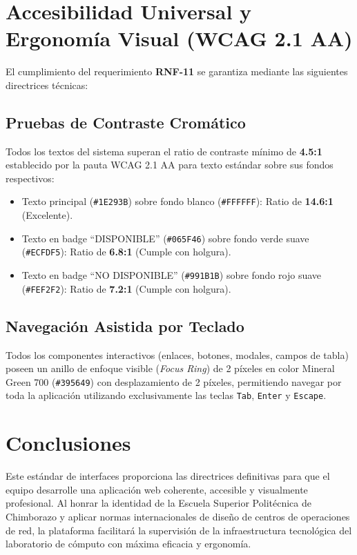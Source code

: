 \documentclass[12pt,a4paper]{report}
\begin{document}
\newpage
\chapter{Accesibilidad Universal y Ergonomía Visual (WCAG 2.1 AA)}

El cumplimiento del requerimiento \textbf{RNF-11} se garantiza mediante las siguientes directrices técnicas:

\section{Pruebas de Contraste Cromático}
Todos los textos del sistema superan el ratio de contraste mínimo de \textbf{4.5:1} establecido por la pauta WCAG 2.1 AA para texto estándar sobre sus fondos respectivos:
\begin{itemize}
  \item Texto principal (\texttt{\#1E293B}) sobre fondo blanco (\texttt{\#FFFFFF}): Ratio de \textbf{14.6:1} (Excelente).
  \item Texto en badge ``DISPONIBLE'' (\texttt{\#065F46}) sobre fondo verde suave (\texttt{\#ECFDF5}): Ratio de \textbf{6.8:1} (Cumple con holgura).
  \item Texto en badge ``NO DISPONIBLE'' (\texttt{\#991B1B}) sobre fondo rojo suave (\texttt{\#FEF2F2}): Ratio de \textbf{7.2:1} (Cumple con holgura).
\end{itemize}

\section{Navegación Asistida por Teclado}
Todos los componentes interactivos (enlaces, botones, modales, campos de tabla) poseen un anillo de enfoque visible (\textit{Focus Ring}) de 2 píxeles en color Mineral Green 700 (\texttt{\#395649}) con desplazamiento de 2 píxeles, permitiendo navegar por toda la aplicación utilizando exclusivamente las teclas \texttt{Tab}, \texttt{Enter} y \texttt{Escape}.

\chapter{Conclusiones}
Este estándar de interfaces proporciona las directrices definitivas para que el equipo desarrolle una aplicación web coherente, accesible y visualmente profesional. Al honrar la identidad de la Escuela Superior Politécnica de Chimborazo y aplicar normas internacionales de diseño de centros de operaciones de red, la plataforma facilitará la supervisión de la infraestructura tecnológica del laboratorio de cómputo con máxima eficacia y ergonomía.
\end{document}
